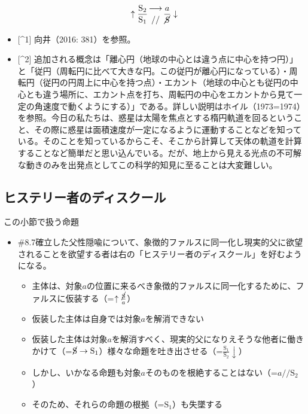 \[
\uparrow\frac{\mathrm{S_2}}{\mathrm{S_1}}\genfrac{}{}{0pt}{}{\longrightarrow}{//}\frac{a}{\mathrm{\cancel{S}}}\downarrow
\]

\begin{itemize}
\tightlist
\item
  {[}\^{}1{]} 向井（2016: 381）を参照。
\item
  {[}\^{}2{]}
  追加される概念は「離心円（地球の中心とは違う点に中心を持つ円）」と「従円（周転円に比べて大きな円。この従円が離心円になっている）・周転円（従円の円周上に中心を持つ点）・エカント（地球の中心とも従円の中心とも違う場所に、エカント点を打ち、周転円の中心をエカントから見て一定の角速度で動くようにする）」である。詳しい説明はホイル（1973=1974）を参照。今日の私たちは、惑星は太陽を焦点とする楕円軌道を回るということ、その際に惑星は面積速度が一定になるように運動することなどを知っている。そのことを知っているからこそ、そこから計算して天体の軌道を計算することなど簡単だと思い込んでいる。だが、地上から見える光点の不可解な動きのみを出発点としてこの科学的知見に至ることは大変難しい。
\end{itemize}

\subsection{ヒステリー者のディスクール}\label{ux30d2ux30b9ux30c6ux30eaux30fcux8005ux306eux30c7ux30a3ux30b9ux30afux30fcux30eb}

\begin{note}{この小節で扱う命題}
  \begin{itemize}
    \tightlist
    \item{\#8.7}確立した父性隠喩について、象徴的ファルスに同一化し現実的父に欲望されることを欲望する者は右の「ヒステリー者のディスクール」を好むようになる。
      \begin{itemize}
        \tightlist
        \item 主体は、対象$a$の位置に来るべき象徴的ファルスに同一化するために、ファルスに仮装する（=$\uparrow\frac{\cancel{\textrm{S}}}{a}$）
        \item 仮装した主体は自身では対象$a$を解消できない
        \item 仮装した主体は対象$a$を解消すべく、現実的父になりえそうな他者に働きかけて（=$\cancel{\textrm{S}}\rightarrow\textrm{S}_1$）様々な命題を吐き出させる（=$\frac{\textrm{S}_1}{\textrm{S}_2}\downarrow$）
        \item しかし、いかなる命題も対象$a$そのものを根絶することはない（=$a//\textrm{S}_2$）
        \item そのため、それらの命題の根拠（=$\textrm{S}_1$）も失墜する
      \end{itemize}
  \end{itemize}
\end{note}

